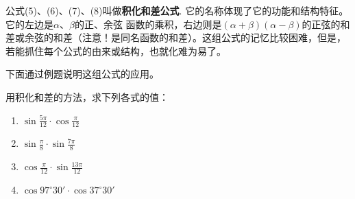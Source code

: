公式(5)、(6)、(7)、(8)叫做\textbf{积化和差公式}. 它的名称体现了它的功能和结构特征。它的左边是$\alpha$、$\beta$的正、余弦 函数的乘积，右边则是$(\alpha+\beta)(\alpha-\beta)$的正弦的和差或余弦的和差（注意！是同名函数的和差）。这组公式的记忆比较困难，但是，若能抓住每个公式的由来或结构，也就化难为易了。

下面通过例题说明这组公式的应用。

\begin{example}
    用积化和差的方法，求下列各式的值：
\begin{multicols}{2}
\begin{enumerate}[(1)]
    \item $\sin\frac{5\pi}{12}\cdot \cos \frac{\pi}{12}$
    \item $\sin\frac{\pi}{8}\cdot \sin\frac{7\pi}{8}$
    \item $\cos\frac{\pi}{12}\cdot \sin\frac{13\pi}{12}$
    \item $\cos97^{\circ}30'\cdot \cos 37^{\circ}30'$
\end{enumerate}
\end{multicols}
\end{example}

